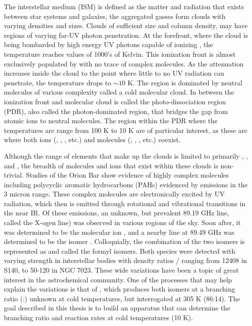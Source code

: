 The interstellar medium (ISM) is defined as the matter and radiation that exists between star systems and galaxies, the aggregated gasses form clouds with varying densities and sizes. Clouds of sufficient size and column density, may have regions of varying far-UV photon penetration. At the forefront, where the cloud is being bombarded by high energy UV photons capable of ionizing , the temperature reaches values of 1000's of Kelvin. This ionization front is almost exclusively populated by  with no trace of complex molecules. As the attenuation increases inside the cloud to the point where little to no UV radiation can penetrate, the temperature drops to $\sim 10$ K. The region is dominated by neutral molecules of various complexity called a cold molecular cloud. In between the ionization front and molecular cloud is called the photo-dissociation region (PDR), also called the photon-dominated region, that bridges the gap from atomic ions to neutral molecules. The region within the PDR where the temperatures are range from 100 K to 10 K are of particular interest, as these are where both ions (, , , etc.) and molecules (, , , etc.) coexist.\cite{Hollenbach1997}

Although the range of elements that make up the clouds is limited to primarily , , and , the breadth of molecules and ions that exist within these clouds is non-trivial. Studies of the Orion Bar show evidence of highly complex molecules including polycyclic aromatic hydrocarbons (PAHs) evidenced by emissions in the 3 micron range.\cite{Sloan1997,Bregman2002} These complex molecules are electronically excited by UV radiation, which then is emitted through rotational and vibrational transitions in the near IR. Of these emissions, an unknown, but prevalent 89.19 GHz line, called the X-ogen line) was observed in various regions of the sky.\cite{Buhl1970} Soon after, it was determined to be the molecular ion , and a nearby line at 89.49 GHz was determined to be the isomer .\cite{Gudeman1982} Colloquially, the combination of the two isomers is represented as \ce{[HCO+]} and called the formyl isomers. Both species were detected with varying strength in interstellar bodies with density ratios / ranging from 12408 in S140, to 50-120 in NGC 7023.\cite{Liszt2004} These wide variations have been a topic of great interest in the astrochemical community. One of the processes that may help explain the variations is that of , which produces both isomers at a branching ratio (:) unknown at cold temperatures, but interrogated at 305 K (86:14).\cite{Freeman1987} The goal described in this thesis is to build an apparatus that can determine the branching ratio and reaction rates at cold temperatures (10 K).